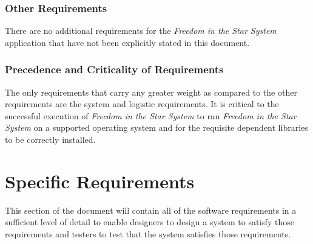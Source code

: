 \documentclass[twoside,letterpaper]{article}
\begin{document}
\subsubsection{Other Requirements}
There are no additional requirements for the \textit{Freedom in the Star System} application that have not been explicitly stated in this document.

\subsubsection{Precedence and Criticality of Requirements}

The only requirements that carry any greater weight as compared to the other requirements are the system and logistic requirements.  It is critical to the successful execution of \textit{Freedom in the Star System} to run \textit{Freedom in the Star System} on a supported operating system and for the requisite dependent libraries to be correctly installed.

\section{Specific Requirements}
This section of the document will contain all of the software requirements in a sufficient level of detail to enable designers to design a system to satisfy those requirements and testers to test that the system satisfies those requirements.
\end{document}
